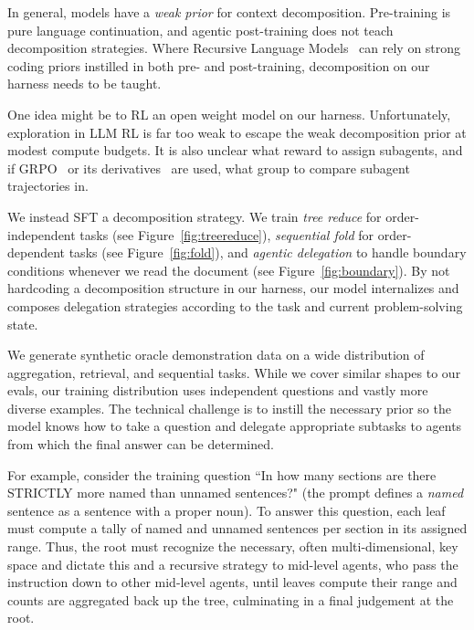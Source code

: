 \documentclass{article} %
\begin{document}
In general, models have a \emph{weak prior} for context decomposition. Pre-training is pure language continuation, and agentic post-training does not teach decomposition strategies. Where Recursive Language Models~\citep{zhang2025rlm} can rely on strong coding priors instilled in both pre- and post-training, decomposition on our harness needs to be taught.

One idea might be to RL an open weight model on our harness. Unfortunately, exploration in LLM RL is far too weak to escape the weak decomposition prior at modest compute budgets. It is also unclear what reward to assign subagents, and if GRPO~\citep{shao2024deepseekmath} or its derivatives~\citep{yu2025dapo,liu2025drgrpo,zheng2025gspo} are used, what group to compare subagent trajectories in.

We instead SFT a decomposition strategy. We train \emph{tree reduce} for order-independent tasks (see Figure~\ref{fig:treereduce}), \emph{sequential fold} for order-dependent tasks (see Figure~\ref{fig:fold}), and \emph{agentic delegation} to handle boundary conditions whenever we read the document (see Figure~\ref{fig:boundary}).
By not hardcoding a decomposition structure in our harness, our model internalizes and composes delegation strategies according to the task and current problem-solving state.




We generate synthetic oracle demonstration data on a wide distribution of aggregation, retrieval, and sequential tasks. While we cover similar shapes to our evals, our training distribution uses independent questions and vastly more diverse examples. The technical challenge is to instill the necessary prior so the model knows how to take a question and delegate appropriate subtasks to agents from which the final answer can be determined.

For example, consider the training question ``In how many sections are there STRICTLY more named than unnamed sentences?" (the prompt defines a \emph{named} sentence as a sentence with a proper noun). To answer this question, each leaf must compute a tally of named and unnamed sentences per section in its assigned range. Thus, the root must recognize the necessary, often multi-dimensional, key space and dictate this and a recursive strategy to mid-level agents, who pass the instruction down to other mid-level agents, until leaves compute their range and counts are aggregated back up the tree, culminating in a final judgement at the root.
\end{document}
